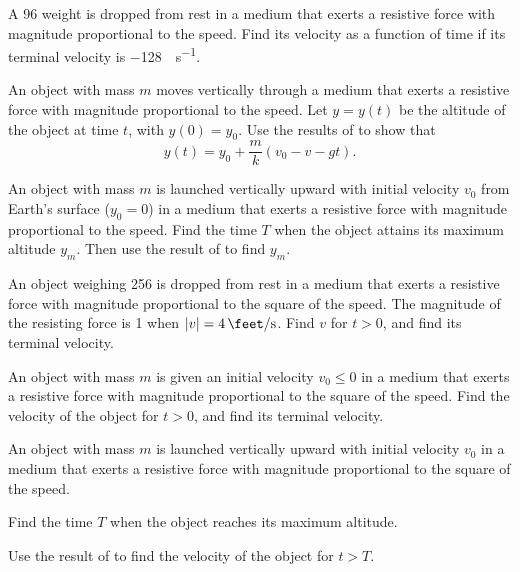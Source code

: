 \begin{exerciselist}
\item\label{exer:4.3.7}A \qty{96}{\pound} weight is dropped from rest in a medium that exerts a
resistive force with magnitude proportional to the speed. Find its
velocity as a function of time if its terminal velocity is \qty{-128}{\feet\per\second}.

\item\label{exer:4.3.8}An object with mass $m$ moves vertically through a medium that exerts
a resistive force with magnitude proportional to the  speed. Let
$y=y(t)$ be the
altitude of the object at time $t$, with $y(0)=y_0$. Use the results
of  to show that
\[
 y(t)=y_0+\frac{m}{k}(v_0-v-gt).
\]

\item\label{exer:4.3.9}An object with mass $m$ is launched vertically upward with initial
velocity $v_0$ from Earth's surface ($y_0=0$) in a medium that exerts
a resistive force with magnitude proportional to the speed. Find the
time $T$ when the object attains its maximum altitude $y_m$. Then use
the result of  to find $y_m$.

\item\label{exer:4.3.10}An object weighing \qty{256}{\pound} is dropped from rest in a medium that
exerts a resistive force with magnitude proportional to the square of
the speed. The magnitude of the resisting force is \qty{1}{\pound} when $|v|=\qty{4}{\feet\per\second}$. Find $v$ for $t > 0$, and find its terminal
velocity.

\item\label{exer:4.3.11}An object with mass $m$ is given an initial velocity $v_0\le0$ in
a medium that exerts
a resistive force with magnitude proportional to the square of the
speed. Find the velocity of the object for $t > 0$, and find its
terminal velocity.


\item\label{exer:4.3.12}An object with mass $m$ is launched vertically upward with initial
velocity $v_0$ in a medium that exerts a resistive force
with magnitude  proportional to the square of the  speed.


\begin{alist}
\item %
Find the time $T$ when the object reaches its maximum
altitude.
\item %
Use the result of  to find the velocity of the
object for $t > T$.
\end{alist}


\end{exerciselist}
